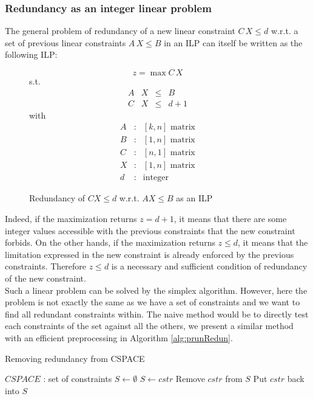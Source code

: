 \documentclass[times, 10pt,twocolumn, a4paper]{article}
\begin{document}
\subsubsection{Redundancy as an integer linear problem}

The general problem of redundancy of a new linear constraint $C \, X \leq d$ w.r.t. a set of previous linear constraints $A \, X \leq B$ in an ILP can itself be written as the following ILP:

\begin{figure}[h]
$$z = \max C \, X$$
s.t.
\[
\begin{array}{rccc}
	A & X &\leq & B \\
	C & X &\leq & d + 1
\end{array}
\]
with
\[
	\begin{array}{ccc}
		A & : & [k,n] \text{ matrix}\\
		B & : & [1,n] \text{ matrix}\\
		C & : & [n,1] \text{ matrix}\\
		X & : & [1,n] \text{ matrix}\\
		d & : & \text{integer}
	\end{array}
\]
\caption{Redundancy of $CX \leq d$ w.r.t. $A X \leq B$ as an ILP}
\end{figure}

Indeed, if the maximization returns $z=d+1$, it means that there are some integer values accessible with the previous constraints that the new constraint forbids. On the other hands, if the maximization returns $z \leq d$, it means that the limitation expressed in the new constraint is already enforced by the previous constraints. Therefore $z \leq d$ is a necessary and sufficient condition of redundancy of the new constraint.\\

Such a linear problem can be solved by the simplex algorithm. However, here the problem is not exactly the same as we have a set of constraints and we want to find all redundant constraints within. The naive method would be to directly test each constraints of the set against all the others, we present a similar method with an efficient preprocessing in Algorithm \ref{alg:prunRedun}.\\

\begin{algorithm}
\caption{Removing redundancy from CSPACE}
\label{alg:prunRedun}
	\begin{algorithmic}[1]
		\STATE $CSPACE$ : set of constraints
		\STATE $S \leftarrow \emptyset$
		\STATE {}
				\STATE $S \leftarrow cstr$
			\ENDIF
		\ENDFOR
		\STATE {}
			\STATE Remove $cstr$ from $S$
				\STATE Put $cstr$ back into $S$
			\ENDIF
		\ENDFOR
	\end{algorithmic}
\end{algorithm}
\end{document}
